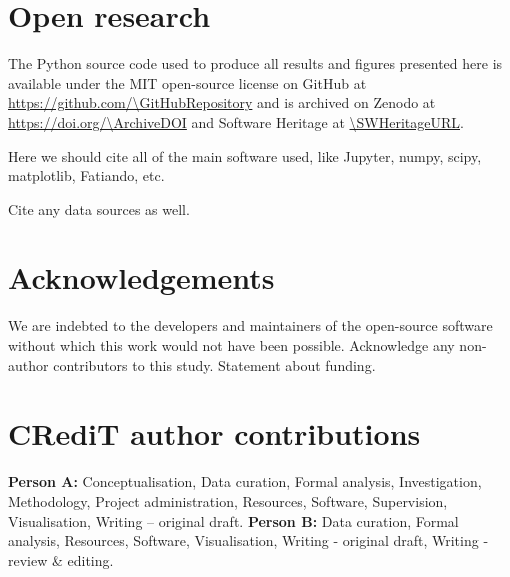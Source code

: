 \section*{Open research}

The Python source code used to produce all results and figures presented here
is available under the MIT open-source license
on GitHub at \url{https://github.com/\GitHubRepository}
and is archived
on Zenodo at \url{https://doi.org/\ArchiveDOI}
and Software Heritage at \url{\SWHeritageURL}.

Here we should cite all of the main software used, like Jupyter, numpy, scipy,
matplotlib, Fatiando, etc.

Cite any data sources as well.


\section*{Acknowledgements}


We are indebted to the developers and maintainers of the open-source software
without which this work would not have been possible.
Acknowledge any non-author contributors to this study.
Statement about funding.


\section*{CRediT author contributions}


\textbf{Person A:} Conceptualisation, Data curation, Formal analysis,
Investigation, Methodology, Project administration, Resources, Software,
Supervision, Visualisation, Writing – original draft.
\textbf{Person B:} Data curation, Formal analysis,
Resources, Software, Visualisation, Writing - original draft, Writing - review
\& editing.
